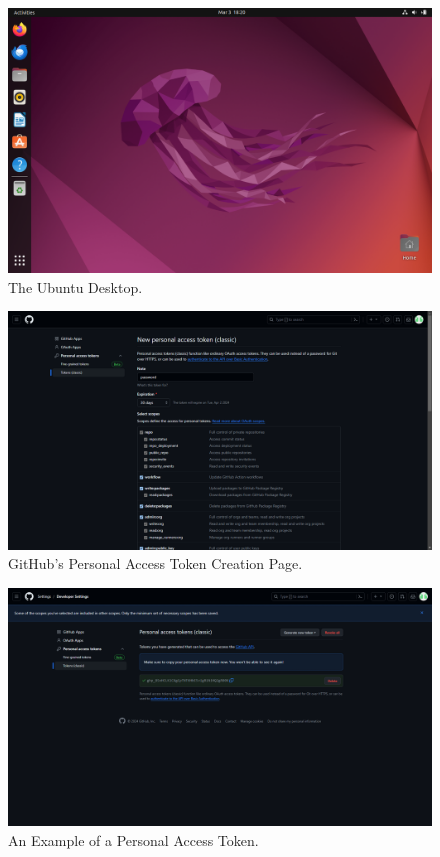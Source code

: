 \documentclass{article}
\begin{document}
\begin{figure}[p]
	\centering
	\includegraphics[width=\textwidth]{ubuntu-desktop.png}
	\caption{The Ubuntu Desktop.}
	\label{fig:ubuntu-desktop}
\end{figure}

\begin{figure}[p]
	\centering
	\includegraphics[width=\textwidth]{token.png}
	\caption{GitHub's Personal Access Token Creation Page.}
	\label{fig:token}
\end{figure}

\begin{figure}[h]
	\centering
	\includegraphics[width=\textwidth]{access-token-copy-and-paste.png}
	\caption{An Example of a Personal Access Token.}
	\label{fig:access-token-copy-and-paste}
\end{figure}
\end{document}
